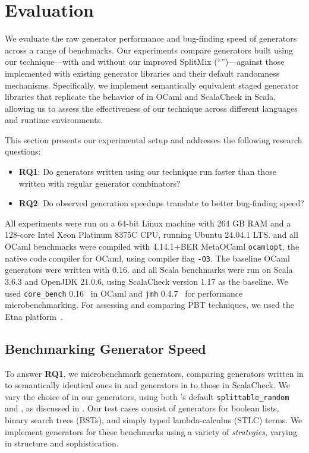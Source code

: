 \documentclass[acmsmall]{acmart}
\theoremstyle{definition}
\begin{document}
\section{Evaluation}
\label{section:eval}
We evaluate the raw generator performance and bug-finding speed of
\name generators across a range of benchmarks. Our experiments compare generators
built using our technique---with and without our improved SplitMix (``\csplitmix'')---against those implemented with
existing generator libraries and their default randomness mechanisms. Specifically,
we implement semantically
equivalent staged generator libraries that replicate the behavior of \bq
in OCaml and ScalaCheck in Scala, allowing us to assess the effectiveness of our
technique across different languages and runtime
environments.

This section presents our experimental setup and addresses the following research questions:

\begin{itemize}
  \item \textbf{RQ1}: Do generators written using our technique run faster than those written with regular generator combinators?
  \item \textbf{RQ2}: Do observed generation speedups translate to better bug-finding speed?
\end{itemize}

All experiments were run on a 64-bit Linux machine with 264 GB RAM and a 128-core Intel Xeon Platinum 8375C CPU, running Ubuntu 24.04.1 LTS. \camlname and all OCaml benchmarks
were compiled with 4.14.1+BER MetaOCaml \texttt{ocamlopt}, the native code compiler for OCaml, using compiler flag \texttt{-O3}.
The baseline OCaml generators were written with \bq{} 0.16.
\scalaname{} and all Scala benchmarks
were run on Scala 3.6.3
and OpenJDK 21.0.6, using ScalaCheck version 1.17 as the baseline.
We used \texttt{core\_bench} 0.16~\cite{corebench} in OCaml and \texttt{jmh} 0.4.7~\cite{jmh} for performance microbenchmarking. For assessing and comparing PBT techniques, we used the Etna platform~\cite{etna}.

\subsection{Benchmarking Generator Speed}
\label{subsection:benchmarking}
To answer \textbf{RQ1}, we microbenchmark generators, comparing generators written in \camlname to semantically identical ones in \bq
and generators in \scalaname to those in ScalaCheck.
 We vary the choice of \rand in our \camlname generators, using both \bq's default
\texttt{splittable\_random} and \csplitmix, as discussed
in . Our test cases consist of generators for boolean lists, binary search trees (BSTs), and simply
typed lambda-calculus (STLC) terms. We implement generators for these benchmarks using a
variety of \textit{strategies}, varying in structure and
sophistication.
\end{document}
